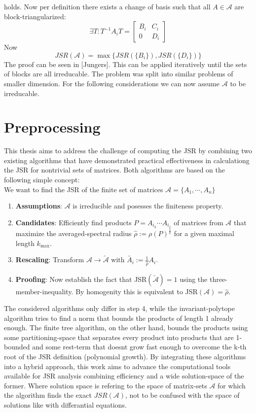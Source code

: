 holds. Now per definition there exists a change of basis such that all $A \in \mathcal{A}$ are block-triangularized: 
$$\exists T: T^{-1}A_{i}T = 
\begin{bmatrix}
B_i & C_i  \\
0 & D_i
\end{bmatrix}
$$
Now 
\begin{equation}
    JSR(\mathcal{A}) = \max\{JSR(\{B_i\}), JSR(\{D_i\})\}
\end{equation}
The proof can be seen in [Jungers].
This can be applied iteratively until the sets of blocks are all irreducable.
The problem was split into similar problems of smaller dimension.
For the following considerations we can now assume $\mathcal{A}$ to be irreducable.

\section{Preprocessing}
This thesis aims to address the challenge of computing the JSR by combining two existing algorithms that have demonstrated practical effectiveness in calculationg the JSR for nontrivial sets of matrices. Both algorithms are based on the following simple concept: \\

We want to find the JSR of the finite set of matrices $\mathcal{A} = \{A_1, \cdots, A_n\}$
\begin{enumerate}
    \item \textbf{Assumptions}: $\mathcal{A}$ is irreducible and posesses the finiteness property. 
    \item \textbf{Candidates}: Efficiently find products $P = A_{i_k} \cdots A_{i_1}$ of matrices from $\mathcal{A}$ that maximize the averaged-spectral radius $\hat{\rho} := \rho(P)^\frac{1}{k}$ for a given maximal length $k_{\text{max}}$.
    \item \textbf{Rescaling}: Transform $\mathcal{A} \to \tilde{\mathcal{A}}$ with $\tilde{A_i} := \frac{1}{\hat{\rho}} A_i$.
    \item \textbf{Proofing}: Now establish the fact that JSR$(\tilde{\mathcal{A}}) = 1$ using the three-member-inequality. By homogenity this is equivalent to JSR$(\mathcal{A}) = \hat{\rho}$.
\end{enumerate}

The considered algorithms only differ in step 4, while the invariant-polytope algorithm tries to find a norm that bounds the products of length 1 already enough. The finite tree algorithm, on the other hand, bounds the products using some partitioning-space that separates every product into products that are 1-bounded and some rest-term that doesnt grow fast enough to overcome the k-th root of the JSR definition (polynomial growth).
By integrating these algorithms into a hybrid approach, this work aims to advance the computational tools available for JSR analysis combining efficiency and a wide solution-space of the former. Where solution space is refering to the space of matrix-sets $\mathcal{A}$ for which the algorithm finds the exact $JSR(\mathcal{A})$, not to be confused with the space of solutions like with differantial equations.
